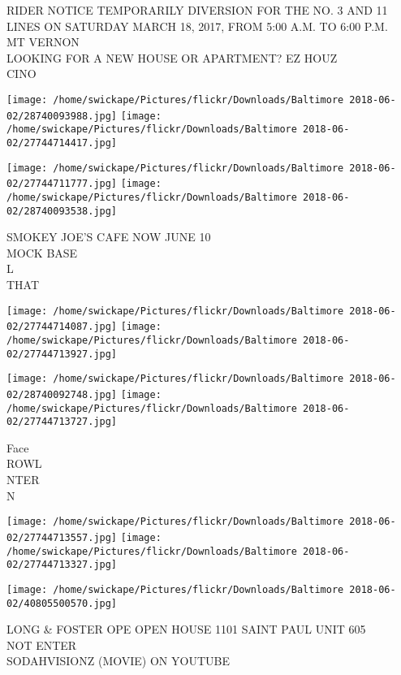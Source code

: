 \documentclass[10pt,letterpaper]{article}
\begin{document}
RIDER NOTICE TEMPORARILY DIVERSION FOR THE NO. 3 AND 11 LINES ON SATURDAY MARCH 18, 2017, FROM 5:00 A.M. TO 6:00 P.M.\\
MT VERNON\\
LOOKING FOR A NEW HOUSE OR APARTMENT?  EZ HOUZ\\
CINO\\
\pagebreak

\texttt{[image: /home/swickape/Pictures/flickr/Downloads/Baltimore 2018-06-02/28740093988.jpg]}
\texttt{[image: /home/swickape/Pictures/flickr/Downloads/Baltimore 2018-06-02/27744714417.jpg]}

\texttt{[image: /home/swickape/Pictures/flickr/Downloads/Baltimore 2018-06-02/27744711777.jpg]}
\texttt{[image: /home/swickape/Pictures/flickr/Downloads/Baltimore 2018-06-02/28740093538.jpg]}

SMOKEY JOE'S CAFE NOW JUNE 10\\
MOCK BASE\\
L\\
THAT\\
\pagebreak

\texttt{[image: /home/swickape/Pictures/flickr/Downloads/Baltimore 2018-06-02/27744714087.jpg]}
\texttt{[image: /home/swickape/Pictures/flickr/Downloads/Baltimore 2018-06-02/27744713927.jpg]}

\texttt{[image: /home/swickape/Pictures/flickr/Downloads/Baltimore 2018-06-02/28740092748.jpg]}
\texttt{[image: /home/swickape/Pictures/flickr/Downloads/Baltimore 2018-06-02/27744713727.jpg]}

Face\\
ROWL\\
NTER\\
N\\
\pagebreak

\texttt{[image: /home/swickape/Pictures/flickr/Downloads/Baltimore 2018-06-02/27744713557.jpg]}
\texttt{[image: /home/swickape/Pictures/flickr/Downloads/Baltimore 2018-06-02/27744713327.jpg]}

\texttt{[image: /home/swickape/Pictures/flickr/Downloads/Baltimore 2018-06-02/40805500570.jpg]}

LONG \& FOSTER OPE OPEN HOUSE 1101 SAINT PAUL UNIT 605\\
NOT ENTER\\
SODAHVISIONZ (MOVIE) ON YOUTUBE\\
\pagebreak
\end{document}
